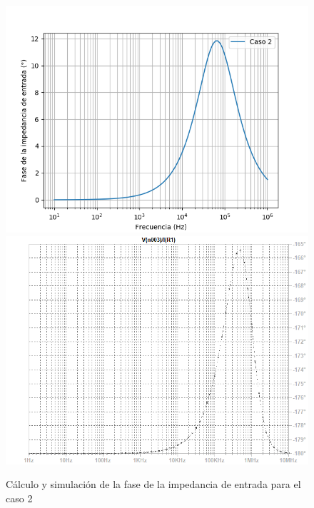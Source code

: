 \begin{figure}[H]
\begin{centering}
\includegraphics[scale=0.5]{../Ex1/iA/Resources1a/zinpp2}\includegraphics[scale=0.4]{../Ex1/iA/Resources1a/zinpp2_sim}
\par\end{centering}
\caption{Cálculo y simulación de la fase de la impedancia de entrada para el
caso 2}
\end{figure}

